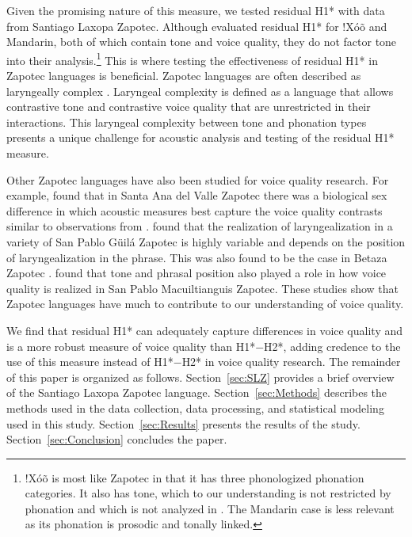 Given the promising nature of this measure, we tested residual H1* with data from Santiago Laxopa Zapotec. Although \citet{chaiH1H2AcousticMeasure2022} evaluated residual H1* for !Xóõ and Mandarin, both of which contain tone and voice quality, they do not factor tone into their analysis.\footnote{!Xóõ is most like Zapotec in that it has three phonologized phonation categories. It also has tone, which to our understanding is not restricted by phonation and which is not analyzed in \citet{chaiH1H2AcousticMeasure2022}. The Mandarin case is less relevant as its phonation is prosodic and tonally linked.} This is where testing the effectiveness of residual H1* in Zapotec languages is beneficial. Zapotec languages are often described as laryngeally complex \citep{silvermanLaryngealComplexityOtomanguean1997,ariza-garciaPhonationTypesTones2018}. Laryngeal complexity is defined as a language that allows contrastive tone and contrastive voice quality that are unrestricted in their interactions. This laryngeal complexity between tone and phonation types presents a unique challenge for acoustic analysis and testing of the residual H1* measure. 

Other Zapotec languages have also been studied for voice quality research. For example, \citet{espositoVariationContrastivePhonation2010} found that in Santa Ana del Valle Zapotec there was a biological sex difference in which acoustic measures best capture the voice quality contrasts similar to observations from \citet{klattAnalysisSynthesisPerception1990}. \citet{arellanesarellanesDosGradosLaringizacion2010} found that the realization of laryngealization in a variety of San Pablo Güilá Zapotec is highly variable and depends on the position of laryngealization in the phrase. This was also found to be the case in Betaza Zapotec \citep{crowhurstInfluenceVowelLaryngealisation2016}. \citet{barzilaiContextdependentPhoneticEnhancement2021} found that tone and phrasal position also played a role in how voice quality is realized in San Pablo Macuiltianguis Zapotec. These studies show that Zapotec languages have much to contribute to our understanding of voice quality. 

We find that residual H1* can adequately capture differences in voice quality and is a more robust measure of voice quality than H1*$-$H2*, adding credence to the use of this measure instead of H1*$-$H2* in voice quality research. The remainder of this paper is organized as follows. Section~\ref{sec:SLZ} provides a brief overview of the Santiago Laxopa Zapotec language. Section~\ref{sec:Methods} describes the methods used in the data collection, data processing, and statistical modeling used in this study. Section~\ref{sec:Results} presents the results of the study. Section~\ref{sec:Conclusion} concludes the paper.

